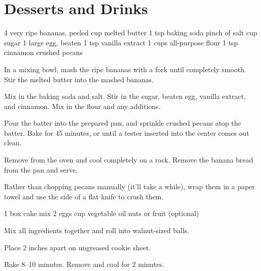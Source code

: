 \chapter{Desserts and Drinks}
\begin{comment}
Meal planning isn't easy, so don't forget
to reward yourself with one (or more) of these desserts
and refreshing drinks.
\end{comment}

\vegetarian
\begin{ingreds}
  4 very ripe bananas, peeled
   cup melted butter
  1 tsp baking soda
  pinch of salt
   cup sugar
  1 large egg, beaten
  1 tsp vanilla extract
  1  cups all-purpose flour
  1 tsp cinnamon
  crushed pecans
\end{ingreds}

\begin{method}
  In a mixing bowl, mash the ripe bananas with
  a fork until completely smooth.
  Stir the melted butter into the mashed bananas.

  Mix in the baking soda and salt.
  Stir in the sugar, beaten egg, vanilla extract, and cinnamon.
  Mix in the flour and any additions.

  Pour the batter into the prepared pan,
  and sprinkle crushed pecans atop the batter.
  Bake for 45 minutes, or until a tester inserted
  into the center comes out clean.

  Remove from the oven and cool completely on a rack.
  Remove the banana bread from the pan and serve.
\end{method}
\begin{tips}
  Rather than chopping pecans manually (it'll take a while),
  wrap them in a paper towel and use the side of
  a flat knife to crush them.
\end{tips}

\vegetarian
\begin{ingreds}
  1 box cake mix
  2 eggs
   cup vegetable oil
  nuts or fruit (optional)
\end{ingreds}
\begin{method}
  Mix all ingredients together and roll into walnut-sized balls.

  Place 2 inches apart on ungreased cookie sheet.

  Bake 8--10 minutes.
  Remove and cool for 2 minutes.
\end{method}

